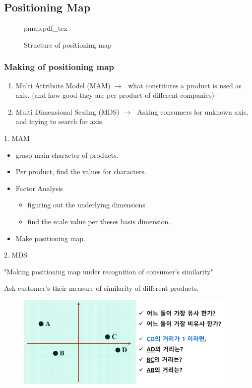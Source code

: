 \documentclass[12pt]{article}
\newcommand{\ra}{$\rightarrow \text{ }$}
\begin{document}
\subsection{Positioning Map}

\begin{figure}[H]
	\centering
	\def\svgwidth{\columnwidth}
	{pmap.pdf_tex}
	\caption{Structure of positioning map}
	\label{fig:pmap}
\end{figure}
\subsubsection{Making of positioning map}
\begin{enumerate}
	\item Multi Attribute Model (MAM)
	\ra what constitutes a product is used as axis. (and how good they are per product of different companies)
	\item Multi Dimensional Scaling (MDS)
	\ra Asking consumers for unknown axis, and trying to search for axis.
\end{enumerate}

1. MAM
\begin{itemize}
	\item grasp main character of products.
	\item Per product, find the values for characters.
	\item Factor Analysis
	\begin{itemize}
		\item figuring out the underlying dimensions
		\item find the scale value per theses basis dimension.
	\end{itemize}
	\item  Make positioning map.
\end{itemize}

2. MDS
\begin{tcolorbox}
	"Making positioning map under recognition of consumer's similarity"

\end{tcolorbox}
Ask customer's their measure of similarity of different products.

\begin{figure}[H]
	\centering
	\includegraphics[width=0.95\textwidth]{img/mds.png}
	\caption{}
	\label{}
\end{figure}
\end{document}
